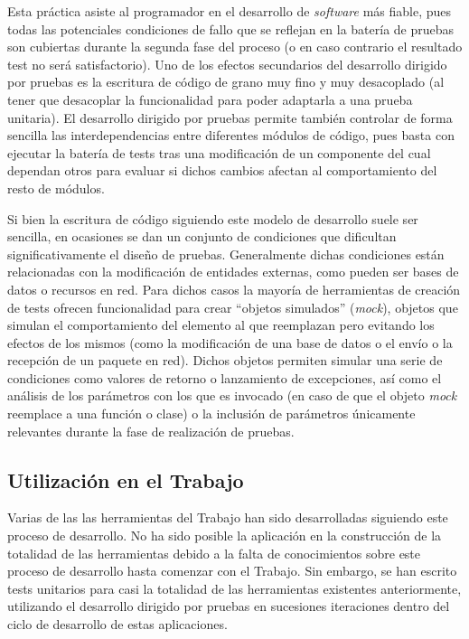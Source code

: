 Esta práctica asiste al programador en el desarrollo de \textit{software} más fiable, pues todas las potenciales condiciones de fallo que se reflejan en la batería de pruebas son cubiertas durante la segunda fase del proceso (o en caso contrario el resultado test no será satisfactorio). Uno de los efectos secundarios del desarrollo dirigido por pruebas es la escritura de código de grano muy fino y muy desacoplado (al tener que desacoplar la funcionalidad para poder adaptarla a una prueba unitaria). El desarrollo dirigido por pruebas permite también controlar de forma sencilla las interdependencias entre diferentes módulos de código, pues basta con ejecutar la batería de tests tras una modificación de un componente del cual dependan otros para evaluar si dichos cambios afectan al comportamiento del resto de módulos.

Si bien la escritura de código siguiendo este modelo de desarrollo suele ser sencilla, en ocasiones se dan un conjunto de condiciones que dificultan significativamente el diseño de pruebas. Generalmente dichas condiciones están relacionadas con la modificación de entidades externas, como pueden ser bases de datos o recursos en red. Para dichos casos la mayoría de herramientas de creación de tests ofrecen funcionalidad para crear ``objetos simulados'' (\textit{mock}), objetos que simulan el comportamiento del elemento al que reemplazan pero evitando los efectos de los mismos (como la modificación de una base de datos o el envío o la recepción de un paquete en red). Dichos objetos permiten simular una serie de condiciones como valores de retorno o lanzamiento de excepciones, así como el análisis de los parámetros con los que es invocado (en caso de que el objeto \textit{mock} reemplace a una función o clase) o la inclusión de parámetros únicamente relevantes durante la fase de realización de pruebas.

\subsection{Utilización en el Trabajo}

Varias de las las herramientas del Trabajo han sido desarrolladas siguiendo este proceso de desarrollo. No ha sido posible la aplicación en la construcción de la totalidad de las herramientas debido a la falta de conocimientos sobre este proceso de desarrollo hasta comenzar con el Trabajo. Sin embargo, se han escrito tests unitarios para casi la totalidad de las herramientas existentes anteriormente, utilizando el desarrollo dirigido por pruebas en sucesiones iteraciones dentro del ciclo de desarrollo de estas aplicaciones.

